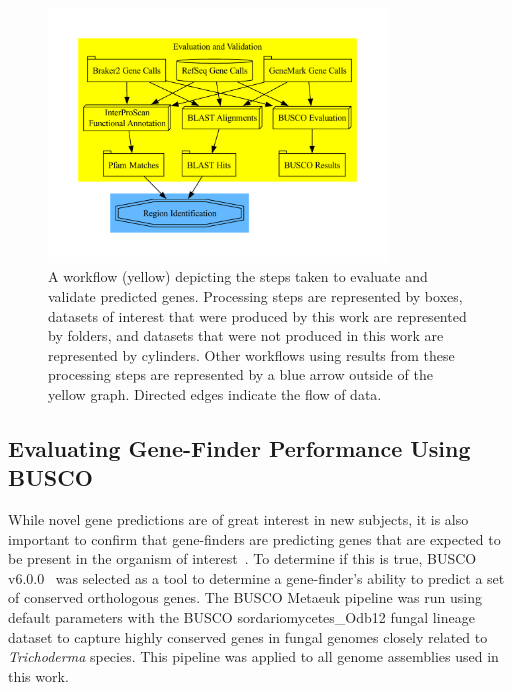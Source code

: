 \begin{figure}
  \centering
  \includegraphics[width=0.8\textwidth]{figures/eval-met.pdf}
  \caption{A workflow (yellow) depicting the steps taken to evaluate
    and validate predicted genes. Processing steps are represented by
    boxes, datasets of interest that were produced by this work are
    represented by folders, and datasets that were not produced in
    this work are represented by cylinders. Other workflows using
    results from these processing steps are represented by a
    blue arrow outside of the yellow graph. Directed edges
    indicate the flow of data.}
  \label{fig:valid}
\end{figure}

\subsection{Evaluating Gene-Finder Performance Using BUSCO}
\label{met:busco}
While novel gene predictions are of great interest in new subjects, it
is also important to confirm that gene-finders are predicting genes
that are expected to be present in the organism of
interest~\cite{manni2021b}. To determine if this
is true, BUSCO v6.0.0~\cite{simao2015a} was selected
as a tool to determine a gene-finder's ability to predict a set of
conserved orthologous genes. The BUSCO Metaeuk pipeline was run using default parameters with the BUSCO sordariomycetes\_Odb12 fungal lineage dataset to capture highly
conserved genes in fungal genomes closely related to \textit{Trichoderma} species. This pipeline was applied to all
genome assemblies used in this work.

